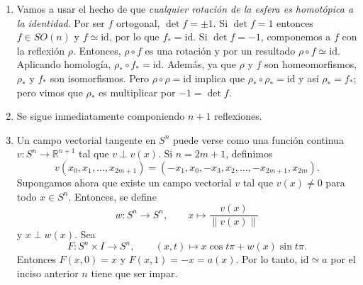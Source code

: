 \documentclass[11pt,a4paper]{article}
\theoremstyle{plain}
\theoremstyle{definition}
\theoremstyle{remark}
\newcommand{\RR}{\mathbb R}
\begin{document}
\begin{enumerate}[label=\arabic*.,leftmargin=*]
\begin{enumerate}[label=\alph*)]
El caso general se sigue del diagrama conmutativo
\[
\begin{tikzcd}
\tilde H_{n-1}(S^{n-1}) \arrow[r,"\rho_*"] \arrow[d,swap,"\sigma","\cong"'] & \tilde H_{n-1}(S^{n-1}) \arrow[d,"\cong","\sigma"'] \\
\tilde H_n(S^n) \arrow[r,swap,"\rho_*"] & \tilde H_n(S^n)
\end{tikzcd}
\]
en donde $\sigma=\hat\delta_q\circ\pi_*\circ j_*^{-1}\circ i_*$. Por
naturalidad de $\hat\delta_q$ se tiene el resultado.
\item Vamos a usar el hecho de que \emph{cualquier rotación de la esfera es
homotópica a la identidad}. Por ser $f$ ortogonal, $\det f=\pm1$. Si
$\det f=1$ entonces $f\in SO(n)$ y $f\simeq\mathrm{id}$, por lo que
$f_*=\mathrm{id}$. Si $\det f=-1$, componemos a $f$ con la reflexión
$\rho$. Entonces, $\rho\circ f$ es una rotación y por un resultado
$\rho\circ f\simeq\mathrm{id}$. Aplicando homología, $\rho_*\circ f_*=\mathrm{id}$.
Además, ya que $\rho$ y $f$ son homeomorfismos, $\rho_*$ y $f_*$ son
isomorfismos. Pero $\rho\circ\rho=\mathrm{id}$ implica que
$\rho_*\circ\rho_*=\mathrm{id}$ y así $\rho_*=f_*$; pero vimos que $\rho_*$
es multiplicar por $-1=\det f$.
\item Se sigue inmediatamente componiendo $n+1$ reflexiones.
\item Un campo vectorial tangente en $S^n$ puede verse como una función
continua $v:S^n\to\RR^{n+1}$ tal que $v\perp v(x)$. Si $n=2m+1$, definimos
\[
v(x_0,x_1,\dots,x_{2m+1})=(-x_1,x_0,-x_3,x_2,\dots,-x_{2m+1},x_{2m}).
\]
Supongamos ahora que existe un campo vectorial $v$ tal que $v(x)\ne0$ para
todo $x\in S^n$. Entonces, se define
\[
w:S^n\to S^n, \qquad x\mapsto\frac{v(x)}{\|v(x)\|}
\]
y $x\perp w(x)$. Sea
\[
F:S^n\times I\to S^n, \qquad (x,t)\mapsto x\cos t\pi+w(x)\sin t\pi.
\]
Entonces $F(x,0)=x$ y $F(x,1)=-x=a(x)$. Por lo tanto,
$\mathrm{id}\simeq a$ por el inciso anterior $n$ tiene que ser impar.
\end{enumerate}


\end{enumerate}
\end{document}
